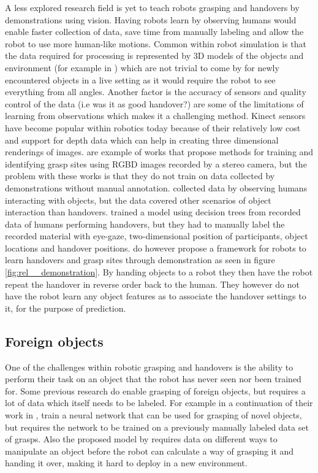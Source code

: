 A less explored research field is yet to teach robots grasping and handovers by demonstrations using vision. Having robots learn by observing humans would enable faster collection of data, save time from manually labeling and allow the robot to use more human-like motions. Common within robot simulation is that the data required for processing is represented by 3D models of the objects and environment (for example in \parencite{Miller2003}) which are not trivial to come by for newly encountered objects in a live setting as it would require the robot to see everything from all angles. Another factor is the accuracy of sensors and quality control of the data (i.e was it as good handover?) are some of the limitations of learning from observations which makes it a challenging method. Kinect sensors have become popular within robotics today because of their relatively low cost and support for depth data which can help in creating three dimensional renderings of images. \parencite{Lenz2015} \parencite{Redmon2014} \parencite{Jiang2011} \parencite{Saxena2008} are example of works that propose methods for training and identifying grasp sites using RGBD images recorded by a stereo camera, but the problem with these works is that they do not train on data collected by demonstrations without manual annotation. \textcite{Chan2014} collected data by observing humans interacting with objects, but the data covered other scenarios of object interaction than handovers. \textcite{Strabala2013} trained a model using decision trees from recorded data of humans performing handovers, but they had to manually label the recorded material with eye-gaze, two-dimensional position of participants, object locations and handover positions. \textcite{Chan2015a} do however propose a framework for robots to learn handovers and grasp sites through demonstration as seen in figure \ref{fig:rel__demonstration}. By handing objects to a robot they then have the robot repeat the handover in reverse order back to the human. They however do not have the robot learn any object features as to associate the handover settings to it, for the purpose of prediction.


\subsection{Foreign objects}

One of the challenges within robotic grasping and handovers is the ability to perform their task on an object that the robot has never seen nor been trained for. Some previous research do enable grasping of foreign objects, but requires a lot of data which itself needs to be labeled. For example \textcite{Huebner2008a} in a continuation of their work in \parencite{Huebner2008}, train a neural network that can be used for grasping of novel objects, but requires the network to be trained on a previously manually labeled data set of grasps. Also the proposed model by \parencite{Chan2014} requires data on different ways to manipulate an object before the robot can calculate a way of grasping it and handing it over, making it hard to deploy in a new environment.

